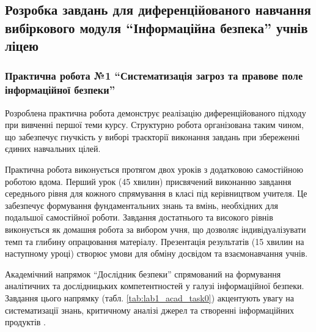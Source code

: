 \subsection{Розробка завдань для диференційованого навчання вибіркового модуля ``Інформаційна безпека'' учнів ліцею}





\subsubsection{Практична робота №1 ``Систематизація загроз та правове поле інформаційної безпеки''}

Розроблена практична робота демонструє реалізацію диференційованого підходу при вивченні першої теми курсу. Структурно робота організована таким чином, що забезпечує гнучкість у виборі траєкторії виконання завдань при збереженні єдиних навчальних цілей.

Практична робота виконується протягом двох уроків з додатковою самостійною роботою вдома. Перший урок (45 хвилин) присвячений виконанню завдання середнього рівня для кожного спрямування в класі під керівництвом учителя. Це забезпечує формування фундаментальних знань та вмінь, необхідних для подальшої самостійної роботи. Завдання достатнього та високого рівнів виконується як домашня робота за вибором учня, що дозволяє індивідуалізувати темп та глибину опрацювання матеріалу. Презентація результатів (15 хвилин на наступному уроці) створює умови для обміну досвідом та взаємонавчання учнів.

Академічний напрямок ``Дослідник безпеки'' спрямований на формування аналітичних та дослідницьких компетентностей у галузі інформаційної безпеки. Завдання цього напрямку (табл. \ref{tab:lab1_acad_task0}) акцентують увагу на систематизації знань, критичному аналізі джерел та створенні інформаційних продуктів .


